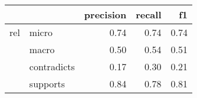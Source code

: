 \begin{tabular}{llrrr}
\toprule
    &          &  precision &  recall &   f1 \\
\midrule
rel & micro &       0.74 &    0.74 & 0.74 \\
    & macro &       0.50 &    0.54 & 0.51 \\
    & contradicts &       0.17 &    0.30 & 0.21 \\
    & supports &       0.84 &    0.78 & 0.81 \\
\bottomrule
\end{tabular}
